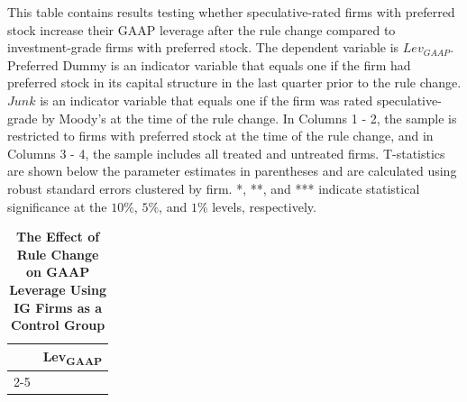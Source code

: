 \documentclass[a4paper, 12pt]{article}
\begin{document}
\begin{table}[htbp]
\caption{\textbf{The Effect of Rule Change on GAAP Leverage Using IG Firms as a Control Group}} \label{table_diff_c}
\begin{singlespace}
\begin{small}

\noindent This table contains results testing whether speculative-rated firms with preferred stock increase their GAAP leverage after the rule change compared to investment-grade firms with preferred stock. The dependent variable is $Lev_{GAAP}$. Preferred Dummy is an indicator variable that equals one if the firm had preferred stock in its capital structure in the last quarter prior to the rule change. $Junk$ is an indicator variable that equals one if the firm was rated speculative-grade by Moody's at the time of the rule change. In Columns 1 - 2, the sample is restricted to firms with preferred stock at the time of the rule change, and in Columns 3 - 4, the sample includes all treated and untreated firms. T-statistics are shown below the parameter estimates in parentheses and are calculated using robust standard errors clustered by firm. *, **, and *** indicate statistical significance at the $10\%$, $5\%$, and $1\%$ levels, respectively.

\end{small}
\end{singlespace}
\vspace{3mm}
\small
  \centering
    \begin{tabular}{lcccc}
    \toprule
    \textbf{ } &
      \multicolumn{4}{c}{\textbf{Lev\textsubscript{GAAP}}}
      \\
      \cline{2-5}

      


    \bottomrule
    \end{tabular}
\end{table}
\clearpage

\newpage
\end{document}

